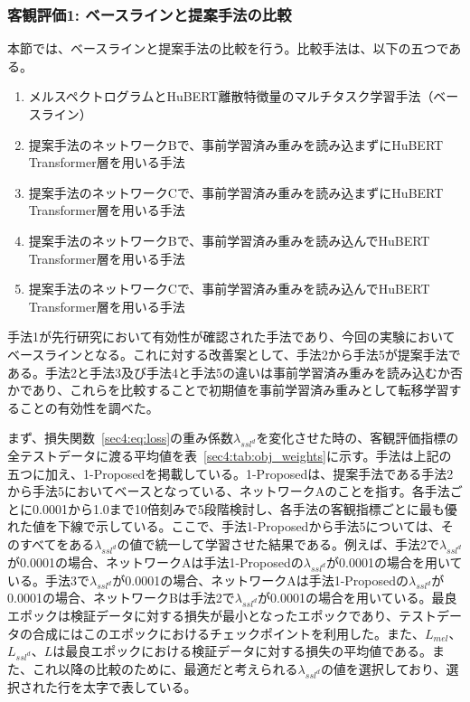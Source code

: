 \documentclass[12pt]{jarticle}
\numberwithin{equation}{section}    %
\numberwithin{figure}{section}      %
\numberwithin{table}{section}      %
\begin{document}
\subsubsection{客観評価1: ベースラインと提案手法の比較}
本節では、ベースラインと提案手法の比較を行う。比較手法は、以下の五つである。
\begin{enumerate}
    \item メルスペクトログラムとHuBERT離散特徴量のマルチタスク学習手法（ベースライン）
    \item 提案手法のネットワークBで、事前学習済み重みを読み込まずにHuBERT Transformer層を用いる手法
    \item 提案手法のネットワークCで、事前学習済み重みを読み込まずにHuBERT Transformer層を用いる手法
    \item 提案手法のネットワークBで、事前学習済み重みを読み込んでHuBERT Transformer層を用いる手法
    \item 提案手法のネットワークCで、事前学習済み重みを読み込んでHuBERT Transformer層を用いる手法
\end{enumerate}
手法1が先行研究において有効性が確認された手法であり、今回の実験においてベースラインとなる。これに対する改善案として、手法2から手法5が提案手法である。手法2と手法3及び手法4と手法5の違いは事前学習済み重みを読み込むか否かであり、これらを比較することで初期値を事前学習済み重みとして転移学習することの有効性を調べた。

まず、損失関数~\eqref{sec4:eq:loss}の重み係数$\lambda_{ssl^{d}}$を変化させた時の、客観評価指標の全テストデータに渡る平均値を表~\ref{sec4:tab:obj_weights}に示す。手法は上記の五つに加え、1-Proposedを掲載している。1-Proposedは、提案手法である手法2から手法5においてベースとなっている、ネットワークAのことを指す。各手法ごとに0.0001から1.0まで10倍刻みで5段階検討し、各手法の客観指標ごとに最も優れた値を下線で示している。ここで、手法1-Proposedから手法5については、そのすべてをある$\lambda_{ssl^{d}}$の値で統一して学習させた結果である。例えば、手法2で$\lambda_{ssl^{d}}$が0.0001の場合、ネットワークAは手法1-Proposedの$\lambda_{ssl^{d}}$が0.0001の場合を用いている。手法3で$\lambda_{ssl^{d}}$が0.0001の場合、ネットワークAは手法1-Proposedの$\lambda_{ssl^{d}}$が0.0001の場合、ネットワークBは手法2で$\lambda_{ssl^{d}}$が0.0001の場合を用いている。最良エポックは検証データに対する損失が最小となったエポックであり、テストデータの合成にはこのエポックにおけるチェックポイントを利用した。また、$L_{mel}$、$L_{ssl^{d}}$、$L$は最良エポックにおける検証データに対する損失の平均値である。また、これ以降の比較のために、最適だと考えられる$\lambda_{ssl^{d}}$の値を選択しており、選択された行を太字で表している。
\end{document}
